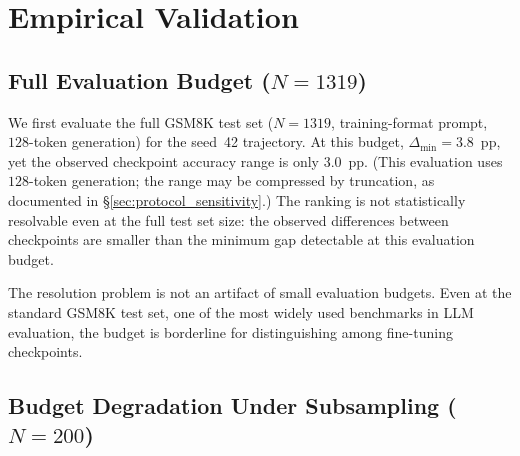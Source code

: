 \documentclass[pdflatex,sn-mathphys-ay,oneside]{sn-jnl}
\theoremstyle{thmstylethree}
\begin{document}
\section{Empirical Validation}\label{sec:primary}

\subsection{Full Evaluation Budget ($N=1319$)}\label{sec:full_budget}

We first evaluate the full GSM8K test set ($N=1319$, training-format prompt, $128$-token generation) for the seed~42 trajectory. At this budget, $\Delta_{\min}=3.8$~pp, yet the observed checkpoint accuracy range is only $3.0$~pp. (This evaluation uses $128$-token generation; the range may be compressed by truncation, as documented in \S\ref{sec:protocol_sensitivity}.) The ranking is not statistically resolvable even at the full test set size: the observed differences between checkpoints are smaller than the minimum gap detectable at this evaluation budget.

The resolution problem is not an artifact of small evaluation budgets. Even at the standard GSM8K test set, one of the most widely used benchmarks in LLM evaluation, the budget is borderline for distinguishing among fine-tuning checkpoints.

\subsection{Budget Degradation Under Subsampling ($N=200$)}\label{sec:budget_degradation}
\end{document}

